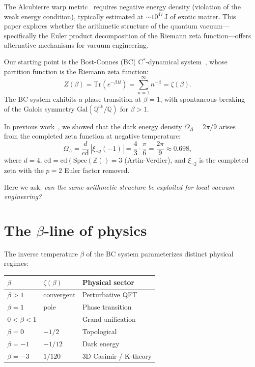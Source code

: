 \documentclass[aps,prd,twocolumn,superscriptaddress,nofootinbib]{revtex4-2}
\newcommand{\Spec}{\mathrm{Spec}}
\newcommand{\Tr}{\mathrm{Tr}}
\newcommand{\cd}{\mathrm{cd}}
\begin{document}
The Alcubierre warp metric~\cite{Alcubierre1994} requires negative
energy density (violation of the weak energy condition), typically
estimated at $\sim 10^{47}$\,J of exotic matter.
This paper explores whether the arithmetic structure of the quantum
vacuum---specifically the Euler product decomposition of the Riemann
zeta function---offers alternative mechanisms for vacuum engineering.

Our starting point is the Bost-Connes (BC) C$^*$-dynamical
system~\cite{BostConnes1995}, whose partition function is the Riemann
zeta function:
\begin{equation}
  Z(\beta) = \Tr(e^{-\beta H}) = \sum_{n=1}^\infty n^{-\beta} = \zeta(\beta).
  \label{eq:bc_partition}
\end{equation}
The BC system exhibits a phase transition at $\beta = 1$, with
spontaneous breaking of the Galois symmetry
$\mathrm{Gal}(\mathbb{Q}^{\mathrm{ab}}/\mathbb{Q})$ for $\beta > 1$.

In previous work~\cite{WB_arithmetic_universe}, we showed that the
dark energy density $\Omega_\Lambda = 2\pi/9$ arises from the
completed zeta function at negative temperature:
\begin{equation}
  \Omega_\Lambda = \frac{d}{\cd} \,|\xi_{\neg 2}(-1)|
  = \frac{4}{3} \cdot \frac{\pi}{6} = \frac{2\pi}{9} \approx 0.698,
\end{equation}
where $d = 4$, $\cd = \cd(\Spec(\mathbb{Z})) = 3$ (Artin-Verdier),
and $\xi_{\neg 2}$ is the completed zeta with the $p = 2$ Euler
factor removed.

Here we ask: \emph{can the same arithmetic structure be exploited
for local vacuum engineering?}

\section{The $\beta$-line of physics}
\label{sec:beta_line}

The inverse temperature $\beta$ of the BC system parameterizes
distinct physical regimes:

\begin{center}
\begin{tabular}{lll}
\toprule
$\beta$ & $\zeta(\beta)$ & Physical sector \\
\midrule
$\beta > 1$ & convergent & Perturbative QFT \\
$\beta = 1$ & pole & Phase transition \\
$0 < \beta < 1$ & & Grand unification \\
$\beta = 0$ & $-1/2$ & Topological \\
$\beta = -1$ & $-1/12$ & Dark energy \\
$\beta = -3$ & $1/120$ & 3D Casimir / K-theory \\
\bottomrule
\end{tabular}
\end{center}
\end{document}
